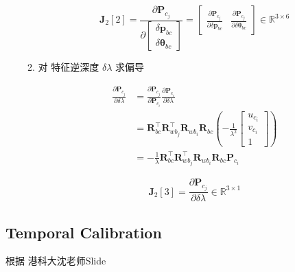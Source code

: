 \documentclass[12pt,a4paper]{article}
\begin{document}
\begin{enumerate}
\begin{enumerate}
\begin{equation}
\mathbf{J}_2[2] =
\frac{\partial \mathbf{P}_{c_{j}}}
{\partial\left[\begin{array}{c}{\delta \mathbf{p}_{bc}} \\ 
{\delta \boldsymbol{\theta}_{bc}}\end{array}\right]} =
\begin{bmatrix}
\frac{\partial \mathbf{P}_{c_{j}}}{\partial \delta \mathbf{p}_{bc}} &
\frac{\partial \mathbf{P}_{c_{j}}}{\partial \delta \boldsymbol{\theta}_{bc}} 
\end{bmatrix}
\in \mathbb{R}^{3 \times 6}
\end{equation}

\item 对 {\color{blue}特征逆深度 $\delta \lambda$} 求偏导

\begin{equation}
\begin{aligned} 
\frac{\partial \mathbf{P}_{c_{j}}}{\partial \delta \lambda} 
&=
\frac{\partial \mathbf{P}_{c_{j}}}{\partial \mathbf{P}_{c_{i}}} 
\frac{\partial \mathbf{P}_{c_{i}}}{\partial \delta \lambda} \\ 
&=
\mathbf{R}_{b c}^{\top} \mathbf{R}_{w b_{j}}^{\top} \mathbf{R}_{w b_{i}} \mathbf{R}_{b c}
\left(-\frac{1}{\lambda^{2}}
\left[\begin{array}{c}{u_{c_{i}}} \\ {v_{c_{i}}} \\ {1}\end{array}\right]\right) \\ 
&=
-\frac{1}{\lambda} \mathbf{R}_{b c}^{\top} \mathbf{R}_{w b_{j}}^{\top} \mathbf{R}_{w b_{i}} \mathbf{R}_{b c} \mathbf{P}_{c_{i}} 
\end{aligned}
\end{equation}

\begin{equation}
\mathbf{J}_2[3] =
\frac{\partial \mathbf{P}_{c_{j}}}{\partial \delta \lambda}
\in \mathbb{R}^{3 \times 1}
\end{equation}

\end{enumerate}

\end{enumerate}

\subsection{Temporal Calibration}

根据 港科大沈老师Slide \cite{shen2018vinsslide}
\end{document}

